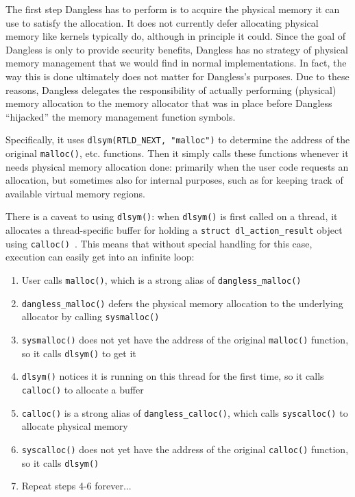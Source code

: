 The first step Dangless has to perform is to acquire the physical memory it can use to satisfy the allocation. It does not currently defer allocating physical memory like kernels typically do, although in principle it could.
Since the goal of Dangless is only to provide security benefits, Dangless has no strategy of physical memory management that we would find in normal implementations. In fact, the way this is done ultimately does not matter for Dangless's purposes. Due to these reasons, Dangless delegates the responsibility of actually performing (physical) memory allocation to the memory allocator that was in place before Dangless ``hijacked'' the memory management function symbols.

Specifically, it uses \lstinline!dlsym(RTLD_NEXT, "malloc")! to determine the address of the original \lstinline!malloc()!, etc. functions. Then it simply calls these functions whenever it needs physical memory allocation done: primarily when the user code requests an allocation, but sometimes also for internal purposes, such as for keeping track of available virtual memory regions.

There is a caveat to using \lstinline!dlsym()!: when \lstinline!dlsym()! is first called on a thread, it allocates a thread-specific buffer for holding a \lstinline!struct dl_action_result! object using \lstinline!calloc()!~\cite{glibc-dlsym-calls-calloc}. This means that without special handling for this case, execution can easily get into an infinite loop:

\begin{enumerate}
	\item User calls \lstinline!malloc()!, which is a strong alias of \lstinline!dangless_malloc()!
	\item \lstinline!dangless_malloc()! defers the physical memory allocation to the underlying allocator by calling \lstinline!sysmalloc()!
	\item \lstinline!sysmalloc()! does not yet have the address of the original \lstinline!malloc()! function, so it calls \lstinline!dlsym()! to get it
	\item \lstinline!dlsym()! notices it is running on this thread for the first time, so it calls \lstinline!calloc()! to allocate a buffer
	\item \lstinline!calloc()! is a strong alias of \lstinline!dangless_calloc()!, which calls \lstinline!syscalloc()! to allocate physical memory
	\item \lstinline!syscalloc()! does not yet have the address of the original \lstinline!calloc()! function, so it calls \lstinline!dlsym()!
	\item Repeat steps 4-6 forever...
\end{enumerate}


